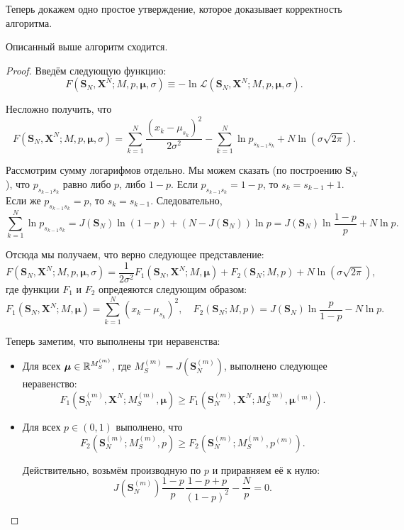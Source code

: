 Теперь докажем одно простое утверждение, которое доказывает корректность 
алгоритма.
\begin{theorem}
	Описанный выше алгоритм сходится.
\end{theorem}
\begin{proof}
	Введём следующую функцию:
	\[
		F(\mathbf{S}_{N}, \mathbf{X}^{N}; M, p, \bm{\mu}, \sigma) \equiv -\ln
		\mathcal{L}(\mathbf{S}_{N}, \mathbf{X}^{N}; M, p, \bm{\mu}, \sigma).
	\]
	
	Несложно получить, что
	\[
		F(\mathbf{S}_{N}, \mathbf{X}^{N}; M, p, \bm{\mu}, \sigma) = \sum_{k = 
		1}^{N} \frac{(x_{k} - \mu_{s_{k}})^{2}}{2\sigma^{2}} - \sum_{k = 1}^{N} 
		\ln p_{s_{k - 1}s_{k}} + N\ln(\sigma\sqrt{2\pi}).
	\]
	
	Рассмотрим сумму логарифмов отдельно. Мы можем сказать (по построению 
	\(\mathbf{S}_{N}\)), что \(p_{s_{k - 1}s_{k}}\) равно либо \(p\), либо \(1 
	- p\). Если \(p_{s_{k - 1}s_{k}} = 1 - p\), то \(s_{k} = s_{k - 1} + 1\). 
	Если же \(p_{s_{k - 1}s_{k}} = p\), то \(s_{k} = s_{k - 1}\). Следовательно,
	\[
		\sum_{k = 1}^{N} \ln p_{s_{k - 1}s_{k}} = J(\mathbf{S}_{N})\ln(1 - p) + 
		(N - J(\mathbf{S}_{N}))\ln p = J(\mathbf{S}_{N})\ln\frac{1 - p}{p} + 
		N\ln p.
	\]
	
	Отсюда мы получаем, что верно следующее представление:
	\[
		F(\mathbf{S}_{N}, \mathbf{X}^{N}; M, p, \bm{\mu}, \sigma) = 
		\frac{1}{2\sigma^{2}}F_{1}(\mathbf{S}_{N}, \mathbf{X}^{N}; M, \bm{\mu}) 
		+ F_{2}(\mathbf{S}_{N}; M, p) + N\ln(\sigma\sqrt{2\pi}),
	\]
	где функции \(F_{1}\) и \(F_{2}\) опредеяются следующим образом:
	\[
		F_{1}(\mathbf{S}_{N}, \mathbf{X}^{N}; M, \bm{\mu}) = \sum_{k = 1}^{N} 
		(x_{k} - \mu_{s_{k}})^{2}, \quad F_{2}(\mathbf{S}_{N}; M, p) = 
		J(\mathbf{S}_{N})\ln\frac{p}{1 - p} - N\ln p.
	\]
	
	Теперь заметим, что выполнены три неравенства:
	\begin{itemize}
		\item Для всех \(\bm{\mu} \in \mathbb{R}^{M_{S}^{(m)}}\), где \(M_{S}^{(m)} = 
		J(\mathbf{S}_{N}^{(m)})\), выполнено следующее неравенство:
		\[
			F_{1}(\mathbf{S}_{N}^{(m)}, \mathbf{X}^{N}; M_{S}^{(m)}, \bm{\mu}) 
			\geq F_{1}(\mathbf{S}_{N}^{(m)}, \mathbf{X}^{N}; M_{S}^{(m)}, 
			\bm{\mu}^{(m)}).
		\]
		
		\item Для всех \(p \in (0, 1)\) выполнено, что
		\[
			F_{2}(\mathbf{S}_{N}^{(m)}; M_{S}^{(m)}, p) \geq 
			F_{2}(\mathbf{S}_{N}^{(m)}; M_{S}^{(m)}, p^{(m)}).
		\]
		
		Действительно, возьмём производную по \(p\) и приравняем её к нулю:
		\[
			J(\mathbf{S}_{N}^{(m)})\frac{1 - p}{p}\frac{1 - p + p}{(1 - p)^{2}} 
			- \frac{N}{p} = 0.
		\]
		

\end{itemize}
\end{proof}
